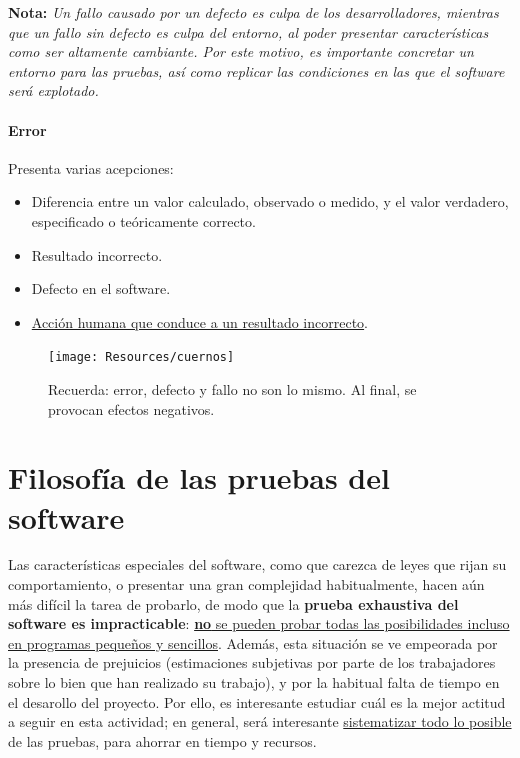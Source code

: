 \textbf{Nota:} \textit{Un fallo causado por un defecto es culpa de los desarrolladores, mientras que un fallo sin defecto es culpa del entorno, al poder presentar características como ser altamente cambiante. Por este motivo, es importante concretar un entorno para las pruebas, así como replicar las condiciones en las que el software será explotado.}

\paragraph{Error} Presenta varias acepciones:
\begin{itemize}
    \item Diferencia entre un valor calculado, observado o medido, y el valor verdadero, especificado o teóricamente correcto.
    \item Resultado incorrecto.
    \item Defecto en el software.
    \item \uline{Acción humana que conduce a un resultado incorrecto}.
\end{itemize}

\begin{figure}[H]
    \centering
    \texttt{[image: Resources/cuernos]}
    \caption{Recuerda: error, defecto y fallo no son lo mismo. Al final, se provocan efectos negativos.}
    \label{fig:cuernos}
\end{figure}


\section{Filosofía de las pruebas del software}

Las características especiales del software, como que carezca de leyes que rijan su comportamiento, o presentar una gran complejidad habitualmente, hacen aún más difícil la tarea de probarlo, de modo que la \textbf{prueba exhaustiva del software es impracticable}: \uline{\textbf{no} se pueden probar todas las posibilidades incluso en programas pequeños y sencillos}. Además, esta situación se ve empeorada por la presencia de prejuicios (estimaciones subjetivas por parte de los trabajadores sobre lo bien que han realizado su trabajo), y por la habitual falta de tiempo en el desarollo del proyecto. Por ello, es interesante estudiar cuál es la mejor actitud a seguir en esta actividad; en general, será interesante \uline{sistematizar todo lo posible} de las pruebas, para ahorrar en tiempo y recursos.\\

